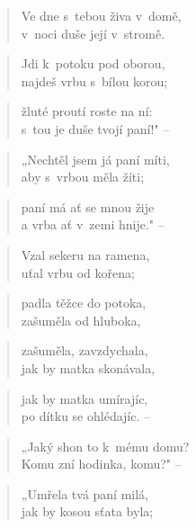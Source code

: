 \begin{verse}
Ve dne s~tebou živa v~domě, \\
v~noci duše její v~stromě.
\end{verse}

\begin{verse}
Jdi k~potoku pod oborou, \\
najdeš vrbu s~bílou korou;
\end{verse}

\begin{verse}
žluté proutí roste na ní: \\
s~tou je duše tvojí paní!" --
\end{verse}

\begin{verse}
„Nechtěl jsem já paní míti, \\
aby s~vrbou měla žíti;
\end{verse}

\begin{verse}
paní má ať se mnou žije \\
a vrba ať v~zemi hnije." --
\end{verse}

\begin{verse}
Vzal sekeru na ramena, \\
uťal vrbu od kořena;
\end{verse}

\begin{verse}
padla těžce do potoka, \\
zašuměla od hluboka,
\end{verse}

\begin{verse}
zašuměla, zavzdychala, \\
jak by matka skonávala,
\end{verse}

\begin{verse}
jak by matka umírajíc, \\
po dítku se ohlédajíc. --
\end{verse}

\begin{verse}
„Jaký shon to k~mému domu? \\
Komu zní hodinka, komu?" --
\end{verse}

\begin{verse}
„Umřela tvá paní milá, \\
jak by kosou sťata byla;
\end{verse}


